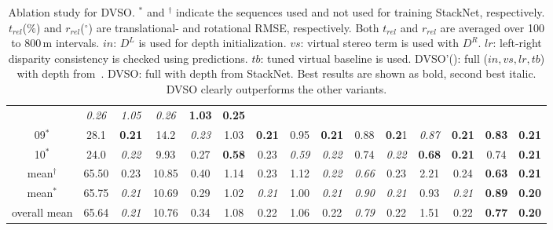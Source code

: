 \documentclass[runningheads]{llncs}
\begin{document}
\begin{table}[tb]
\begin{tabular}{c|cc|cc|cc|cc|cc|cc|cc}
		& 
		\textit{0.26}& \textit{1.05} & \textit{0.26}& \textbf{1.03} & 
		\textbf{0.25}
		\\
		09$^\ast$   & 28.1 & \textbf{0.21} & 14.2 & \textit{0.23} & 1.03 & 
		\textbf{0.21} & 0.95 & 
		\textbf{0.21}&0.88
		& 
		\textbf{0.2}1& \textit{0.87} & \textbf{0.21}& \textbf{0.83} & 
		\textbf{0.21}
		\\
		10$^\ast$   & 24.0 & \textit{0.22} & 9.93 & 0.27 & \textbf{0.58} & 0.23 
		&\textit{0.59} & 
		\textit{0.22}& 0.74 & \textit{0.22}& \textbf{0.68} & \textbf{0.21}& 
		0.74 & \textbf{0.21}
		\\ 
		\hline
		\hline
		mean$^\dagger$ & 65.50 & 0.23 & 10.85 & 0.40 & 1.14 & 0.23& 1.12 & 
		\textit{0.22}&\textit{0.66} & 
		0.23& 2.21 & 0.24& 
		\textbf{0.63} & 
		\textbf{0.21}
		\\
		mean$^\ast$ & 65.75 & \textit{0.21} & 10.69 & 0.29 & 1.02 & 
		\textit{0.21}& 1.00 & 
		\textit{0.21}&\textit{0.90} & 
		\textit{0.21}&0.93 & \textit{0.21}& 
		\textbf{0.89} & 
		\textbf{0.20}
		\\
		overall mean & 65.64 & \textit{0.21} & 10.76 & 0.34 & 1.08 & 0.22& 1.06 
		& 
		0.22&\textit{0.79} & 
		0.22& 1.51 & 0.22& 
		\textbf{0.77} & 
		\textbf{0.20}
		\\
	\end{tabular}
	\caption{Ablation study for DVSO. $^\ast$ and $^\dagger$ indicate the 
	sequences 
	used and not used for training StackNet, respectively. $t_{rel}$($\%$) and 
		$r_{rel}$($^\circ$) are 
		translational-
		 and rotational RMSE, respectively. Both $t_{rel}$ and 
		$r_{rel}$
		are
		averaged over 100 to 800\,m intervals. $in$: $D^{L}$ is used for 
		depth initialization. $vs$: virtual stereo term is used with $D^{R}$. 
		$lr$: left-right disparity consistency is checked using predictions. 
		$tb$: tuned virtual baseline is used. 
		DVSO'(\cite{godard2016unsupervised}): full ($in,vs,lr,tb$) with 
		depth 
		from~\cite{godard2016unsupervised}. DVSO: full with 
		depth from StackNet. Best results are shown as bold, 
		second 
		best italic. DVSO clearly outperforms the other variants.}
	\label{tab:diff_settings}
\end{table}
\end{document}
